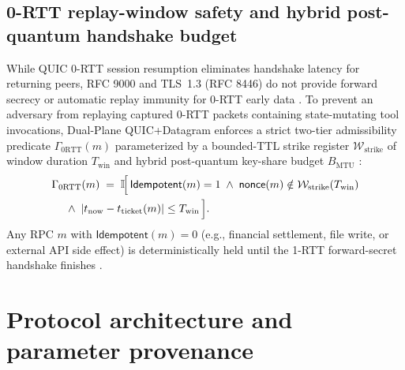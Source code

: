 \documentclass[11pt]{article}
\begin{document}
\subsection{0-RTT replay-window safety and hybrid post-quantum handshake budget}

While QUIC 0-RTT session resumption eliminates handshake latency for returning peers, RFC 9000 and TLS~1.3 (RFC 8446) do not provide forward secrecy or automatic replay immunity for 0-RTT early data \citep{rescorla2018rfc8446, fischlin2024quic}. To prevent an adversary from replaying captured 0-RTT packets containing state-mutating tool invocations, Dual-Plane QUIC+Datagram enforces a strict two-tier admissibility predicate $\Gamma_{\mathrm{0RTT}}(m)$ parameterized by a bounded-TTL strike register $\mathcal{W}_{\mathrm{strike}}$ of window duration $T_{\mathrm{win}}$ and hybrid post-quantum key-share budget $B_{\mathrm{MTU}}$ \citep{commey2026matter, phamtuan2026hpqake}:
\begin{equation}
\begin{aligned}
&\Gamma_{\mathrm{0RTT}}(m) \;=\; \mathbb{I}\!\Bigl[\,\mathsf{Idempotent}(m) = 1 \;\wedge\; \mathsf{nonce}(m) \notin \mathcal{W}_{\mathrm{strike}}(T_{\mathrm{win}}) \\
&\quad \;\wedge\; |t_{\mathrm{now}} - t_{\mathrm{ticket}}(m)| \le T_{\mathrm{win}}\,\Bigr].
\end{aligned}
\label{eq:hybrid_pqc_0rtt}
\end{equation}
Any RPC $m$ with $\mathsf{Idempotent}(m) = 0$ (e.g., financial settlement, file write, or external API side effect) is deterministically held until the 1-RTT forward-secret handshake finishes \citep{fischlin2024quic, elina2026maat}.

\section{Protocol architecture and parameter provenance}\label{sec:architecture}
\end{document}
